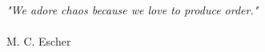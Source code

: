 \thispagestyle{plain}
\vspace*{\fill}
\begin{flushright}
\textit{"We adore chaos because we love to produce order."}

\paragraph{}
M. C. Escher
\vspace*{\fill}
\end{flushright}